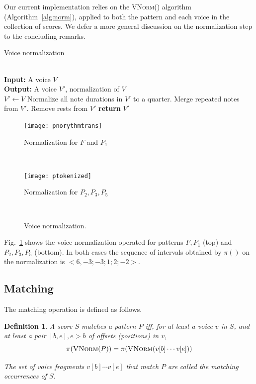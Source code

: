 \documentclass[letterpaper, 11pt]{article}
\newtheorem{Definition}{Definition}
\begin{document}
Our current implementation relies on
the \textsc{VNorm}() algorithm (Algorithm~\ref{alg:norm}), applied to both the pattern and each voice in
the collection of scores. We defer a more general discussion on the normalization step to the concluding remarks.

\begin{algorithm}
 \caption{Voice  normalization\label{alg:norm}}
 \begin{algorithmic}[1]
\\
\textbf{Input:} A voice $V$\\
\textbf{Output:} A voice $V'$, normalization of $V$\\
\State $V' \gets V$
\State Normalize all note durations in $V'$ to a quarter.
\State Merge repeated notes from $V'$.
\State Remove rests from $V'$
\State \textbf{return} $V'$
\EndProcedure
\end{algorithmic}
\end{algorithm}

\begin{figure}[ht]
\begin{center}
\begin{minipage}[b]{7cm}
\texttt{[image: pnorythmtrans]}
\centerline{Normalization for $F$ and $P_1$}
\end{minipage}\\
\begin{minipage}[b]{7cm}
\texttt{[image: ptokenized]}
\centerline{Normalization for $P_2, P_3, P_5$}
\end{minipage} \\
\end{center}
\caption{\label{normalized} Voice normalization.}
\end{figure}

Fig.~\ref{normalized} shows the voice normalization operated for patterns
$F, P_1$ (top) and $P_2, P_3, P_5$ (bottom). In both cases the sequence of intervals
obtained by $\pi()$ on the normalization is $<6, -3; -3; 1; 2; -2>$. 

\subsection{Matching}

The matching operation is defined as follows.

\begin{Definition}
A score $S$ \emph{matches} a pattern $P$ iff, for \emph{at least} a voice $v$
in $S$, and \emph{at
least} a pair $[b,e], e > b$ of offsets (positions) in $v$,
 $$\pi(\textsc{VNorm}(P)) =  \pi (\textsc{VNorm}(v[b]\cdots v[e]))$$

The set of voice fragments  $v[b]\cdots v[e]$ that match $P$ are called
the \emph{matching occurrences} of $S$.
\end{Definition}
\end{document}
